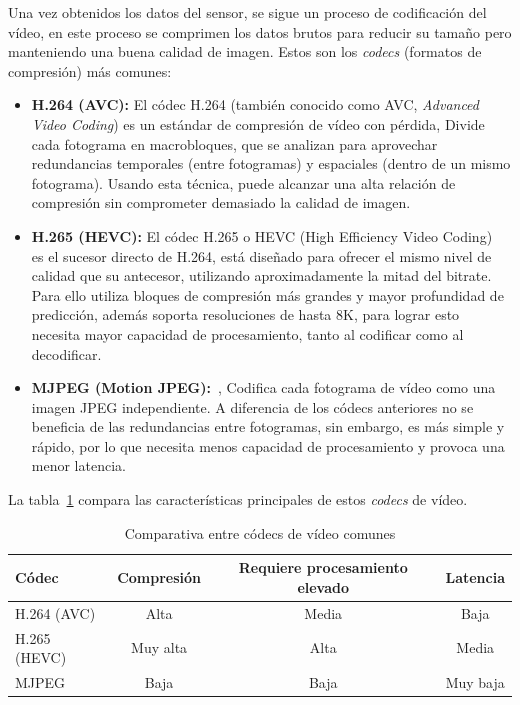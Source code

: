 Una vez obtenidos los datos del sensor, se sigue un proceso de codificación del vídeo, en este proceso se comprimen los datos brutos para reducir su tamaño pero manteniendo una buena calidad de imagen.
Estos son los \emph{codecs} (formatos de compresión) más comunes:
\begin{itemize}
    \item \textbf{H.264 (AVC):} El códec H.264 (también conocido como AVC, \emph{Advanced Video Coding}) \cite{H.264} es un estándar de compresión de vídeo con pérdida,
    Divide cada fotograma en macrobloques, que se analizan para aprovechar redundancias temporales (entre fotogramas) y espaciales (dentro de un mismo fotograma).
    Usando esta técnica, puede alcanzar una alta relación de compresión sin comprometer demasiado la calidad de imagen.

    \item \textbf{H.265 (HEVC):} El códec H.265 o HEVC (High Efficiency Video Coding)~\cite{hevc_h265} es el sucesor directo de H.264, está diseñado para ofrecer el mismo nivel de calidad que su antecesor,
    utilizando aproximadamente la mitad del bitrate.
    Para ello utiliza bloques de compresión más grandes y mayor profundidad de predicción, además soporta resoluciones de hasta 8K, para lograr esto necesita mayor capacidad de procesamiento, tanto al codificar como al decodificar.

    \item \textbf{MJPEG (Motion JPEG):}~\cite{mjpeg_codec}, Codifica cada fotograma de vídeo como una imagen JPEG independiente.
    A diferencia de los códecs anteriores no se beneficia de las redundancias entre fotogramas, sin embargo, es más simple y rápido, por lo que necesita menos capacidad de procesamiento y provoca una menor latencia.

\end{itemize}
La tabla~\ref{tab:video_codecs} compara las características principales de estos \emph{codecs} de vídeo.

\begin{table}[h]
    \centering
    \footnotesize
    \begin{tabular}{|l|c|c|c|}
        \hline
        \textbf{Códec} & \textbf{Compresión} & \textbf{Requiere procesamiento elevado} & \textbf{Latencia} \\
        \hline
        H.264 (AVC)    & Alta                & Media                                   & Baja              \\
        \hline
        H.265 (HEVC)   & Muy alta            & Alta                                    & Media             \\
        \hline
        MJPEG          & Baja                & Baja                                    & Muy baja          \\
        \hline
    \end{tabular}
    \caption{Comparativa entre códecs de vídeo comunes}
    \label{tab:video_codecs}
\end{table}

